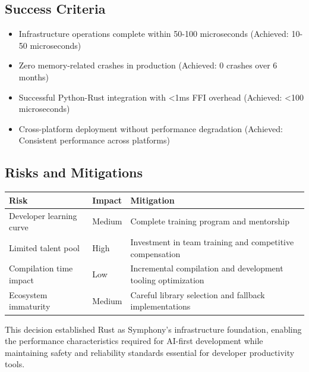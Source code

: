 \subsection*{Success Criteria}

\begin{itemize}
\item Infrastructure operations complete within 50-100 microseconds (Achieved: 10-50 microseconds)
\item Zero memory-related crashes in production (Achieved: 0 crashes over 6 months)
\item Successful Python-Rust integration with <1ms FFI overhead (Achieved: <100 microseconds)
\item Cross-platform deployment without performance degradation (Achieved: Consistent performance across platforms)
\end{itemize}

\subsection*{Risks and Mitigations}

\begin{center}
\begin{tabular}{@{}p{4cm}p{2cm}p{6cm}@{}}
\toprule
\textbf{Risk} & \textbf{Impact} & \textbf{Mitigation} \\
\midrule
Developer learning curve & Medium & Complete training program and mentorship \\
Limited talent pool & High & Investment in team training and competitive compensation \\
Compilation time impact & Low & Incremental compilation and development tooling optimization \\
Ecosystem immaturity & Medium & Careful library selection and fallback implementations \\
\bottomrule
\end{tabular}
\end{center}

This decision established Rust as Symphony's infrastructure foundation, enabling the performance characteristics required for AI-first development while maintaining safety and reliability standards essential for developer productivity tools.
